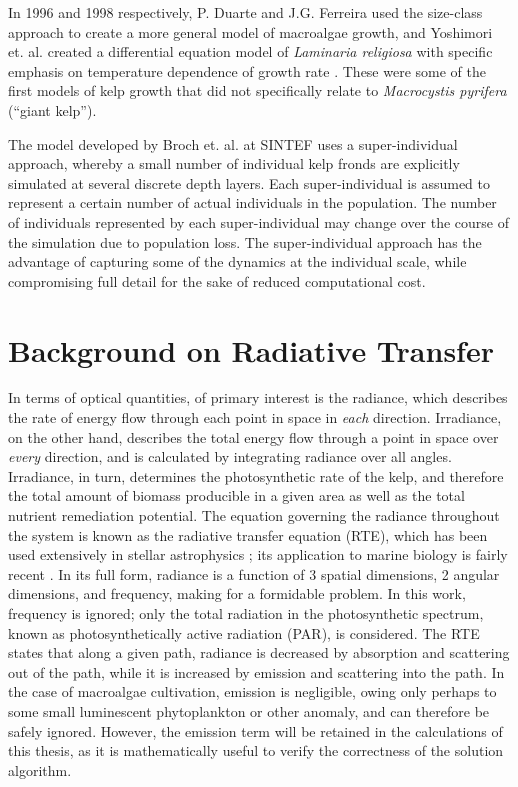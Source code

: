 \documentclass[ms,cpyr,lof,lot]{uathesis}
\begin{document}
In 1996 and 1998 respectively, P. Duarte and J.G. Ferreira used the size-class approach to create a more general model of macroalgae growth, and Yoshimori et. al. created a differential equation model of \textit{Laminaria religiosa} with specific emphasis on temperature dependence of growth rate \cite{duarte_model_1997,yoshimori_mathematical_1998}.
These were some of the first models of kelp growth that did not specifically relate to \textit{Macrocystis pyrifera} (``giant kelp'').

The model developed by Broch et. al. at SINTEF \cite{broch_modelling_2012, broch_modelling_2013, handa_seasonal_2013} uses a super-individual approach, whereby a small number of individual kelp fronds are explicitly simulated at several discrete depth layers.
Each super-individual is assumed to represent a certain number of actual individuals in the population.
The number of individuals represented by each super-individual may change over the course of the simulation due to population loss.
The super-individual approach has the advantage of capturing some of the dynamics at the individual scale, while compromising full detail for the sake of reduced computational cost.

\section{Background on Radiative Transfer}
In terms of optical quantities, of primary interest is the radiance, which describes the rate of energy flow through each point in space in \textit{each} direction.
Irradiance, on the other hand, describes the total energy flow through a point in space over \textit{every} direction, and is calculated by integrating radiance over all angles.
Irradiance, in turn, determines the photosynthetic rate of the kelp, and therefore the total amount of biomass producible in a given area as well as the total nutrient remediation potential.
The equation governing the radiance throughout the system is known as the radiative transfer equation (RTE), which has been used extensively in stellar astrophysics \cite{chandrasekhar_radiative_1960,petkova_novel_2011}; its application to marine biology is fairly recent \cite{mobley_radiative_2001}.
In its full form, radiance is a function of 3 spatial dimensions, 2 angular dimensions, and frequency, making for a formidable problem.
In this work, frequency is ignored; only the total radiation in the photosynthetic spectrum, known as photosynthetically active radiation (PAR), is considered.
The RTE states that along a given path, radiance is decreased by absorption and scattering out of the path, while it is increased by emission and scattering into the path.
In the case of macroalgae cultivation, emission is negligible, owing only perhaps to some small luminescent phytoplankton or other anomaly, and can therefore be safely ignored.
However, the emission term will be retained in the calculations of this thesis, as it is mathematically useful to verify the correctness of the solution algorithm.
\end{document}
